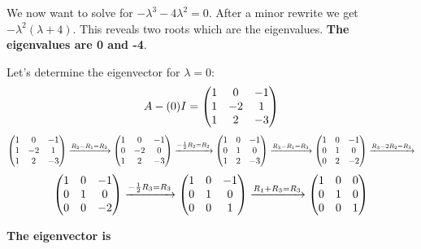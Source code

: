 \documentclass{article}
\begin{document}
{{\par \noindent We now want to solve for \( -\lambda^3 - 4\lambda^2 = 0\). After a minor rewrite we get \( -\lambda ^2 ( \lambda + 4)\). This reveals two roots which are the eigenvalues. \textbf{The eigenvalues are 0 and -4}.
\newline
\par \noindent Let's determine the eigenvector for \(\lambda = 0\):
\[
A - (0)I = 
\left(\begin{array}{@{}ccc@{}}
	1 &  0 & -1 \\
	1 & -2 & 1 \\
	1 & 2 & -3 \\
\end{array}\right)
\]
\[
\left(\begin{array}{@{}ccc@{}}
	1 &  0 & -1 \\
	1 & -2 & 1 \\
	1 & 2 & -3 \\
\end{array}\right) \xrightarrow[]{R_2 - R_1 = R_2}
\left(\begin{array}{@{}ccc@{}}
	1 &  0 & -1 \\
	0 & -2 & 0 \\
	1 & 2 & -3 \\
\end{array}\right) \xrightarrow[]{-\frac{1}{2}R_2 = R_2}
\left(\begin{array}{@{}ccc@{}}
	1 &  0 & -1 \\
	0 & 1 & 0 \\
	1 & 2 & -3 \\
\end{array}\right) \xrightarrow[]{R_3 - R_1 = R_3}
\left(\begin{array}{@{}ccc@{}}
	1 &  0 & -1 \\
	0 & 1 & 0 \\
	0 & 2 & -2 \\
\end{array}\right) \xrightarrow[]{R_3 - 2R_2 = R_3}
\] 
\[
\left(\begin{array}{@{}ccc@{}}
	1 &  0 & -1 \\
	0 & 1 & 0 \\
	0 & 0 & -2 \\
\end{array}\right) \xrightarrow[]{-\frac{1}{2}R_3 = R_3}
\left(\begin{array}{@{}ccc@{}}
	1 &  0 & -1 \\
	0 & 1 & 0 \\
	0 & 0 & 1 \\
\end{array}\right) \xrightarrow[]{R_1 + R_3 = R_3}
\left(\begin{array}{@{}ccc@{}}
	1 &  0 & 0 \\
	0 & 1 & 0 \\
	0 & 0 & 1 \\
\end{array}\right)
\]
\newline
\par \noindent \textbf{The eigenvector is \(<1,1,1>\)}
}}
\end{document}
